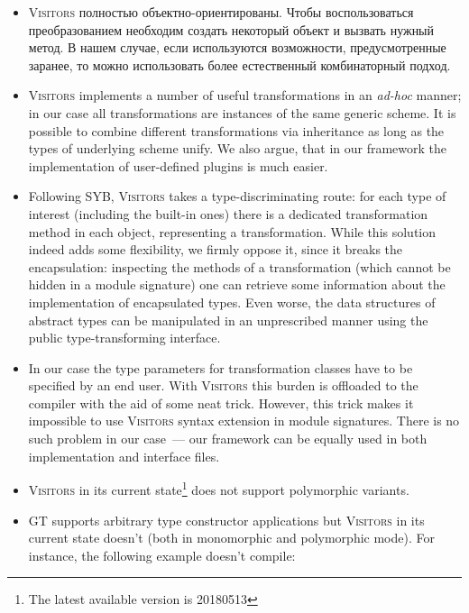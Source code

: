 \begin{itemize}
   \item \textsc{Visitors} полностью объектно-ориентированы. Чтобы воспользоваться преобразованием необходим создать некоторый объект и вызвать нужный метод. В нашем случае, если используются возможности, предусмотренные заранее, то можно использовать более естественный комбинаторный подход.
     
   \item \textsc{Visitors} implements a number of useful transformations in an \emph{ad-hoc} manner; in our case all transformations are instances of the
     same generic scheme. It is possible to combine different transformations via inheritance as long as the types of underlying scheme unify. We also argue, that
     in our framework the implementation of user-defined plugins is much easier.
     
   \item Following SYB, \textsc{Visitors} takes a type-discriminating route: for each type of interest (including the built-in ones) there is a dedicated
     transformation method in each object, representing a transformation. While this solution indeed adds some flexibility, we firmly oppose it, since it
     breaks the encapsulation: inspecting the methods of a transformation (which cannot be hidden in a module signature) one can retrieve some
     information about the implementation of encapsulated types. Even worse, the data structures of abstract types can be manipulated in an unprescribed
     manner using the public type-transforming interface.

   \item In our case the type parameters for transformation classes have to be specified by an end user. With \textsc{Visitors} this burden is offloaded to the
     compiler with the aid of some neat trick. However, this trick makes it impossible to use \textsc{Visitors} syntax extension in module signatures. There is no
     such problem in our case~--- our framework can be equally used in both implementation and interface files.

   \item \textsc{Visitors} in its current state\footnote{The latest available version is 20180513} does not support polymorphic variants.
   
   \item \textsc{GT} supports arbitrary type constructor applications but \textsc{Visitors} in its current state doesn't (both in monomorphic and polymorphic mode).
     For instance, the following example doesn't compile:
     

\end{itemize}
